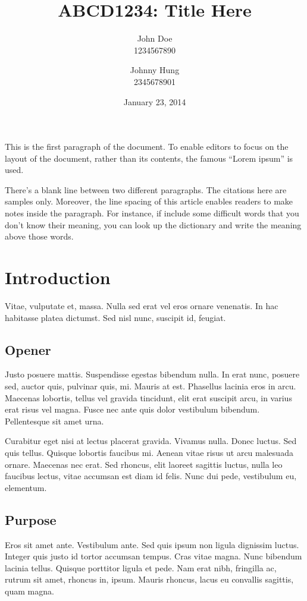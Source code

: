 \documentclass[12pt,a4paper]{article}
\title{ABCD1234: Title Here}
\author{
  John Doe\\  %
  1234567890  %
  \and
  Johnny Hung\\
  2345678901
}
\date{January 23, 2014}
\begin{document}
\maketitle

This is the first paragraph of the document.  To enable editors to
focus on the layout of the document, rather than its contents, the
famous ``Lorem ipsum'' is used.

There's a blank line between two different paragraphs.  The citations
here are samples only.  \parencite{Gnu13}  Moreover, the line spacing
of this article enables readers to make notes inside the paragraph.
For instance, if \textcite{kaplan2010users} include some difficult
words that you don't know their meaning, you can look up the
dictionary and write the meaning above those words.

\section{Introduction}

Vitae, vulputate et, massa. Nulla sed erat vel eros ornare venenatis.
In hac habitasse platea dictumst. Sed nisl nunc, suscipit id, feugiat.

\subsection{Opener}

Justo posuere mattis. Suspendisse egestas bibendum nulla. In erat
nunc, posuere sed, auctor quis, pulvinar quis, mi. Mauris at est.
Phasellus lacinia eros in arcu. Maecenas lobortis, tellus vel gravida
tincidunt, elit erat suscipit arcu, in varius erat risus vel magna.
Fusce nec ante quis dolor vestibulum bibendum. Pellentesque sit amet
urna.

Curabitur eget nisi at lectus placerat gravida. Vivamus nulla. Donec
luctus. Sed quis tellus. Quisque lobortis faucibus mi. Aenean vitae
risus ut arcu malesuada ornare. Maecenas nec erat. Sed rhoncus, elit
laoreet sagittis luctus, nulla leo faucibus lectus, vitae accumsan est
diam id felis. Nunc dui pede, vestibulum eu, elementum.

\subsection{Purpose}

Eros sit amet ante. Vestibulum ante. Sed quis ipsum non ligula
dignissim luctus. Integer quis justo id tortor accumsan tempus. Cras
vitae magna.  Nunc bibendum lacinia tellus. Quisque porttitor ligula
et pede. Nam erat nibh, fringilla ac, rutrum sit amet, rhoncus in,
ipsum. Mauris rhoncus, lacus eu convallis sagittis, quam magna.
\end{document}
